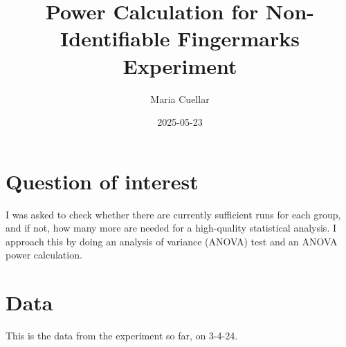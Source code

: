 \documentclass[
]{article}
\title{Power Calculation for Non-Identifiable Fingermarks Experiment}
\author{Maria Cuellar}
\date{2025-05-23}
\begin{document}
\maketitle

\renewcommand{\thetable}{\thesection\arabic{table}} 
\renewcommand{\theHtable}{\thesection\arabic{table}} 
\setcounter{table}{0}

\section{Question of interest}\label{question-of-interest}

I was asked to check whether there are currently sufficient runs for
each group, and if not, how many more are needed for a high-quality
statistical analysis. I approach this by doing an analysis of variance
(ANOVA) test and an ANOVA power calculation.

\section{Data}\label{data}

This is the data from the experiment so far, on 3-4-24.
\end{document}
